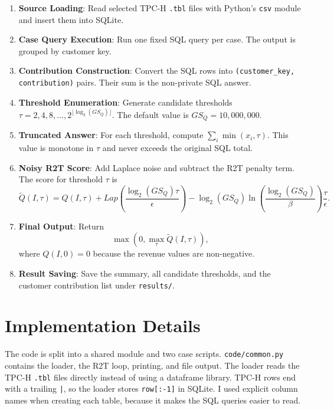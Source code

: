 \documentclass[12pt,a4paper]{report}
\begin{document}
\begin{enumerate}
    \item \textbf{Source Loading}: Read selected TPC-H \texttt{.tbl}
    files with Python's \texttt{csv} module and insert them into SQLite.

    \item \textbf{Case Query Execution}: Run one fixed SQL query per
    case.  The output is grouped by customer key.

    \item \textbf{Contribution Construction}: Convert the SQL rows into
    \texttt{(customer\_key, contribution)} pairs.  Their sum is the
    non-private SQL answer.

    \item \textbf{Threshold Enumeration}: Generate candidate thresholds
    $\tau = 2,4,8,\ldots,2^{\lfloor \log_2(GS_Q)\rfloor}$. The default
    value is $GS_Q=10{,}000{,}000$.

    \item \textbf{Truncated Answer}: For each threshold, compute
    $\sum_i \min(x_i,\tau)$. This value is monotone in $\tau$ and never
    exceeds the original SQL total.

    \item \textbf{Noisy R2T Score}: Add Laplace noise and subtract the R2T
    penalty term. The score for threshold $\tau$ is
    \[
    \widetilde{Q}(I,\tau)
    = Q(I,\tau)
    + Lap\left(\frac{\log_2(GS_Q)\tau}{\epsilon}\right)
    - \log_2(GS_Q)\ln\left(\frac{\log_2(GS_Q)}{\beta}\right)
    \frac{\tau}{\epsilon}.
    \]

    \item \textbf{Final Output}: Return
    \[
    \max\left(0,\max_\tau \widetilde{Q}(I,\tau)\right),
    \]
    where $Q(I,0)=0$ because the revenue values are non-negative.

    \item \textbf{Result Saving}: Save the summary, all candidate
    thresholds, and the customer contribution list under \texttt{results/}.
\end{enumerate}

\section{Implementation Details}

The code is split into a shared module and two case scripts.
\texttt{code/common.py} contains the loader, the R2T loop, printing, and
file output.  The loader reads the TPC-H \texttt{.tbl} files directly
instead of using a dataframe library.  TPC-H rows end with a trailing
\texttt{|}, so the loader stores \texttt{row[:-1]} in SQLite.  I used
explicit column names when creating each table, because it makes the SQL
queries easier to read.
\end{document}

